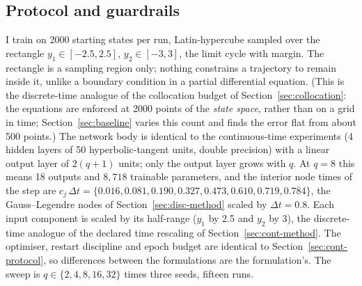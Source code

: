 \documentclass[11pt,a4paper]{article}
\begin{document}
\subsection{Protocol and guardrails}
\label{sec:guardrails}

I train on 2000 starting states per run, Latin-hypercube sampled over
the rectangle $y_1 \in [-2.5, 2.5]$, $y_2 \in [-3, 3]$, the limit cycle
with margin. The rectangle is a sampling region only; nothing constrains
a trajectory to remain inside it, unlike a boundary condition in a
partial differential equation. (This is the discrete-time
analogue of the collocation budget of Section~\ref{sec:collocation}: the
equations are enforced at 2000 points of the \emph{state space}, rather
than on a grid in time; Section~\ref{sec:baseline} varies this count and
finds the error flat from about 500 points.) The network body is
identical to the continuous-time experiments (4 hidden layers of 50
hyperbolic-tangent units, double precision) with a linear output layer
of $2(q+1)$ units; only the output layer grows with $q$. At $q = 8$ this
means 18 outputs and $8{,}718$ trainable parameters, and the interior
node times of the step are
$c_j\,\Delta t = \{0.016, 0.081, 0.190, 0.327, 0.473, 0.610, 0.719,
0.784\}$, the Gauss--Legendre nodes of
Section~\ref{sec:disc-method} scaled by $\Delta t = 0.8$. Each input
component is scaled by its half-range ($y_1$ by 2.5 and $y_2$ by
3), the discrete-time analogue of the declared time rescaling of
Section~\ref{sec:cont-method}. The optimiser, restart discipline and
epoch budget are identical to Section~\ref{sec:cont-protocol}, so
differences between the formulations are the formulation's. The sweep is
$q \in \{2, 4, 8, 16, 32\}$ times three seeds, fifteen runs.
\end{document}
